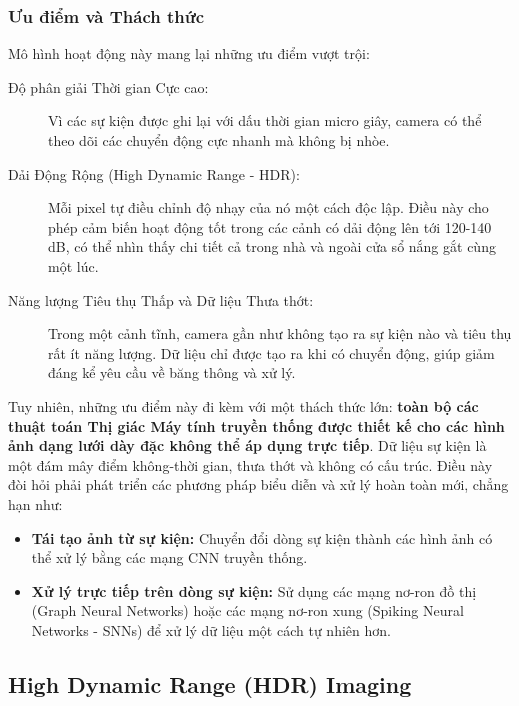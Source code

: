 \subsubsection{Ưu điểm và Thách thức}
\label{subsubsec:event_camera_pros_cons}
Mô hình hoạt động này mang lại những ưu điểm vượt trội:
\begin{description}
    \item[Độ phân giải Thời gian Cực cao:] Vì các sự kiện được ghi lại với dấu thời gian micro giây, camera có thể theo dõi các chuyển động cực nhanh mà không bị nhòe.
    \item[Dải Động Rộng (High Dynamic Range - HDR):] Mỗi pixel tự điều chỉnh độ nhạy của nó một cách độc lập. Điều này cho phép cảm biến hoạt động tốt trong các cảnh có dải động lên tới 120-140 dB, có thể nhìn thấy chi tiết cả trong nhà và ngoài cửa sổ nắng gắt cùng một lúc.
    \item[Năng lượng Tiêu thụ Thấp và Dữ liệu Thưa thớt:] Trong một cảnh tĩnh, camera gần như không tạo ra sự kiện nào và tiêu thụ rất ít năng lượng. Dữ liệu chỉ được tạo ra khi có chuyển động, giúp giảm đáng kể yêu cầu về băng thông và xử lý.
\end{description}
Tuy nhiên, những ưu điểm này đi kèm với một thách thức lớn: \textbf{toàn bộ các thuật toán Thị giác Máy tính truyền thống được thiết kế cho các hình ảnh dạng lưới dày đặc không thể áp dụng trực tiếp}. Dữ liệu sự kiện là một đám mây điểm không-thời gian, thưa thớt và không có cấu trúc. Điều này đòi hỏi phải phát triển các phương pháp biểu diễn và xử lý hoàn toàn mới, chẳng hạn như:
\begin{itemize}
    \item \textbf{Tái tạo ảnh từ sự kiện:} Chuyển đổi dòng sự kiện thành các hình ảnh có thể xử lý bằng các mạng CNN truyền thống.
    \item \textbf{Xử lý trực tiếp trên dòng sự kiện:} Sử dụng các mạng nơ-ron đồ thị (Graph Neural Networks) hoặc các mạng nơ-ron xung (Spiking Neural Networks - SNNs) để xử lý dữ liệu một cách tự nhiên hơn.
\end{itemize}

\subsection{High Dynamic Range (HDR) Imaging}
\label{subsec:hdr_imaging}

